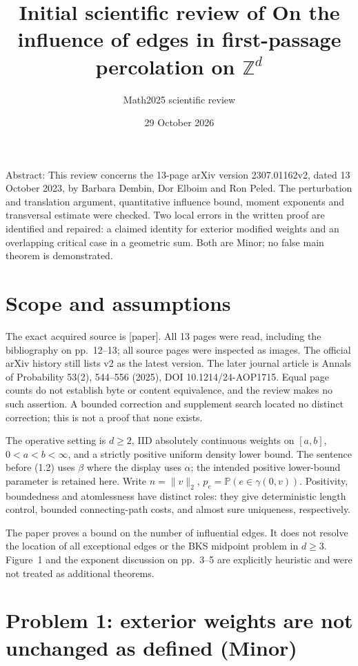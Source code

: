 \documentclass[10pt]{article}
\title{Initial scientific review of
On the influence of edges in first-passage percolation on \(\mathbb Z^d\)}
\author{Math2025 scientific review}
\date{29 October 2026}
\begin{document}
\maketitle
Abstract: This review concerns the 13-page arXiv version 2307.01162v2, dated 13 October 2023, by Barbara Dembin, Dor Elboim and Ron Peled. The perturbation and translation argument, quantitative influence bound, moment exponents and transversal estimate were checked. Two local errors in the written proof are identified and repaired: a claimed identity for exterior modified weights and an overlapping critical case in a geometric sum. Both are Minor; no false main theorem is demonstrated.\par
\section*{Scope and assumptions}
The exact acquired source is [paper]. All 13 pages were read, including the bibliography on pp. 12–13; all source pages were inspected as images. The official arXiv history still lists v2 as the latest version. The later journal article is Annals of Probability 53(2), 544–556 (2025), DOI 10.1214/24-AOP1715. Equal page counts do not establish byte or content equivalence, and the review makes no such assertion. A bounded correction and supplement search located no distinct correction; this is not a proof that none exists.\par
The operative setting is \(d\geq2\), IID absolutely continuous weights on \([a,b]\), \(0<a<b<\infty\), and a strictly positive uniform density lower bound. The sentence before (1.2) uses \(\beta\) where the display uses \(\alpha\); the intended positive lower-bound parameter is retained here. Write \(n=\|v\|_2\), \(p_e=\mathbb P(e\in\gamma(0,v))\). Positivity, boundedness and atomlessness have distinct roles: they give deterministic length control, bounded connecting-path costs, and almost sure uniqueness, respectively.\par
The paper proves a bound on the number of influential edges. It does not resolve the location of all exceptional edges or the BKS midpoint problem in \(d\geq3\). Figure 1 and the exponent discussion on pp. 3–5 are explicitly heuristic and were not treated as additional theorems.\par
\section*{Problem 1: exterior weights are not unchanged as defined (Minor)}
\end{document}
